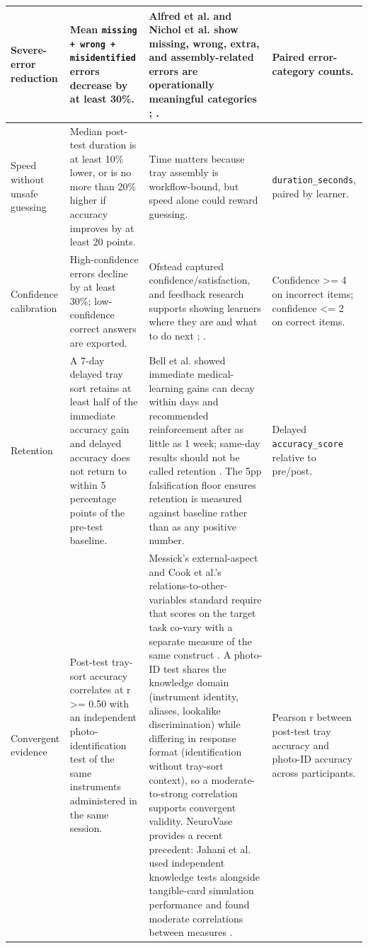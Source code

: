 \documentclass[10pt,a4paper]{article}
\begin{document}
\begin{table}[H]
\begin{tabularx}{\textwidth}{|>{\raggedright\arraybackslash}X|>{\raggedright\arraybackslash}X|>{\raggedright\arraybackslash}X|>{\raggedright\arraybackslash}X|}
Severe-error reduction & Mean \texttt{missing + wrong + misidentified} errors decrease by at least 30\%. & Alfred et al. and Nichol et al. show missing, wrong, extra, and assembly-related errors are operationally meaningful categories \cite{alfred-et-al-2021}; \cite{nichol-et-al-2024}. & Paired error-category counts. \\
\hline
Speed without unsafe guessing & Median post-test duration is at least 10\% lower, or is no more than 20\% higher if accuracy improves by at least 20 points. & Time matters because tray assembly is workflow-bound, but speed alone could reward guessing. & \texttt{duration\_seconds}, paired by learner. \\
\hline
Confidence calibration & High-confidence errors decline by at least 30\%; low-confidence correct answers are exported. & Ofstead captured confidence/satisfaction, and feedback research supports showing learners where they are and what to do next \cite{ofstead-et-al-2023}; \cite{hattie-and-timperley-2007}. & Confidence >= 4 on incorrect items; confidence <= 2 on correct items. \\
\hline
Retention & A 7-day delayed tray sort retains at least half of the immediate accuracy gain and delayed accuracy does not return to within 5 percentage points of the pre-test baseline. & Bell et al. showed immediate medical-learning gains can decay within days and recommended reinforcement after as little as 1 week; same-day results should not be called retention \cite{bell-et-al-2008}. The 5pp falsification floor ensures retention is measured against baseline rather than as any positive number. & Delayed \texttt{accuracy\_score} relative to pre/post. \\
\hline
Convergent evidence & Post-test tray-sort accuracy correlates at r >= 0.50 with an independent photo-identification test of the same instruments administered in the same session. & Messick's external-aspect and Cook et al.'s relations-to-other-variables standard require that scores on the target task co-vary with a separate measure of the same construct \cite{messick-validity-1989, cook-beckman-validity-2006}. A photo-ID test shares the knowledge domain (instrument identity, aliases, lookalike discrimination) while differing in response format (identification without tray-sort context), so a moderate-to-strong correlation supports convergent validity. NeuroVase provides a recent precedent: Jahani et al. used independent knowledge tests alongside tangible-card simulation performance and found moderate correlations between measures \cite{jahani-et-al-2026-neurovase}. & Pearson r between post-test tray accuracy and photo-ID accuracy across participants. \\

\end{tabularx}
\end{table}
\end{document}
